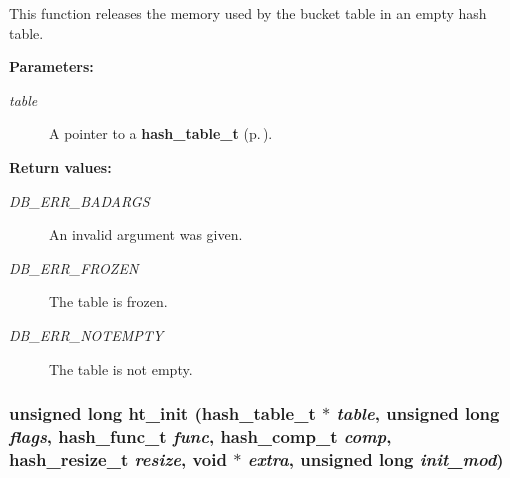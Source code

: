  This function releases the memory used by the bucket table in an empty hash table.\begin{Desc}
\item[{\bf Parameters: }]\par
\begin{description}
\item[
{\em table}]A pointer to a {\bf hash\_\-table\_\-t} {\rm (p.\,\pageref{group__dbprim__hash_a0})}.\end{description}
\end{Desc}
\begin{Desc}
\item[{\bf Return values: }]\par
\begin{description}
\item[
{\em DB\_\-ERR\_\-BADARGS}]An invalid argument was given. \item[
{\em DB\_\-ERR\_\-FROZEN}]The table is frozen. \item[
{\em DB\_\-ERR\_\-NOTEMPTY}]The table is not empty. \end{description}
\end{Desc}
\subsubsection{\setlength{\rightskip}{0pt plus 5cm}unsigned long ht\_\-init ({\bf hash\_\-table\_\-t} $\ast$ {\em table}, unsigned long {\em flags}, {\bf hash\_\-func\_\-t} {\em func}, {\bf hash\_\-comp\_\-t} {\em comp}, {\bf hash\_\-resize\_\-t} {\em resize}, void $\ast$ {\em extra}, unsigned long {\em init\_\-mod})}\label{group__dbprim__hash_a6}




